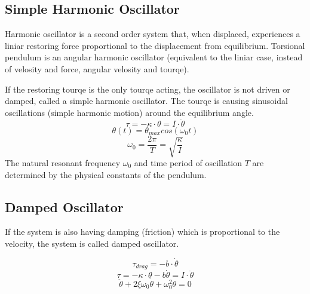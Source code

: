 \documentclass[\main/master.tex]{subfiles}
\begin{document}
\subsection{Simple Harmonic Oscillator}
Harmonic oscillator is a second order system that, when displaced, experiences a liniar restoring force proportional to the displacement from equilibrium. Torsional pendulum is an angular harmonic oscillator (equivalent to the liniar case, instead of velosity and force, angular velosity and tourqe).
\par

If the restoring tourqe is the only tourqe acting, the oscillator is not driven or damped, called a simple harmonic oscillator. The tourqe is causing sinusoidal oscillations (simple harmonic motion) around the equilibrium angle.  
\begin{equation}
\tau = -\kappa\cdot\theta  = I\cdot\ddot{\theta}   \label{eqn:undamped_motion_equation}
\end{equation}
\begin{equation}
\theta(t) = \theta_{max}cos(\omega_0 t )    \label{eqn:undamped_motion_equation}
\end{equation}
\begin{equation}
\omega_0  = \frac{2\pi}{T} = \sqrt{\frac{\kappa}{I}}   \label{eqn:undamped_motion_equation}
\end{equation}
The natural resonant frequency $\omega_0$ and time period of oscillation $T$ are determined by the physical constants of the pendulum.
\subsection{Damped Oscillator}
If the system is also having damping (friction) which is proportional to the velocity, the system is called damped oscillator.


\begin{equation}
\tau_{drag} = -b\cdot\dot{\theta}   \label{eqn:friction_tourqe}
\end{equation} 
\begin{equation}
\tau = -\kappa\cdot\theta - b\dot{\theta}  = I\cdot\ddot{\theta}   \label{eqn:damped_motion_equation}
\end{equation} 
\begin{equation}
\ddot{\theta} + 2\xi\omega_0\dot{\theta} + \omega_0^2\theta = 0   \label{eqn:damped_motion_equation}
\end{equation}
\end{document}
